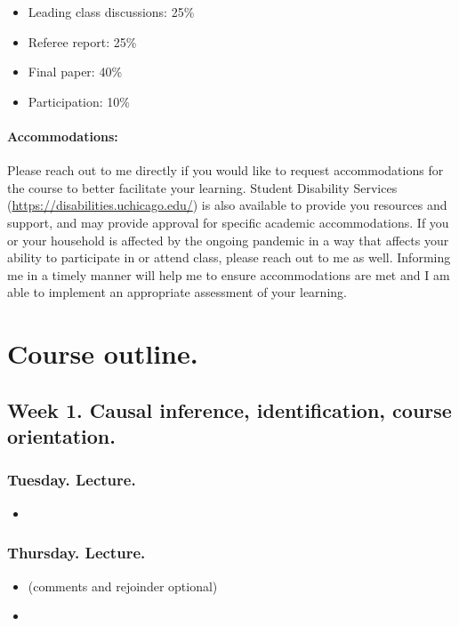 \documentclass[letterpaper, 12pt, parskip=full,DIV=10]{scrartcl}
\begin{document}
\begin{itemize}[topsep=0pt,itemsep=-1ex,partopsep=1ex,parsep=1ex]
\item Leading class discussions: 25\% 
\item Referee report: 25\%
\item Final paper: 40\%
\item Participation: 10\%
\end{itemize}

\paragraph{Accommodations:} Please reach out to me directly if you would like to request accommodations for the course to better facilitate your learning. Student Disability Services (\url{https://disabilities.uchicago.edu/}) is also available to provide you resources and support, and may provide approval for specific academic accommodations. If you or your household is affected by the ongoing pandemic in a way that affects your ability to participate in or attend class, please reach out to me as well. Informing me in a timely manner will help me to ensure accommodations are met and I am able to implement an appropriate assessment of your learning. 


\section*{Course outline.}

\subsection*{Week 1. Causal inference, identification, course orientation.}


\subsubsection*{Tuesday. Lecture.}
\begin{itemize}
\item {}
\end{itemize}

\subsubsection*{Thursday. Lecture.}

\begin{itemize}
\item {}

(comments and rejoinder optional)
\item {}
\end{itemize}
\end{document}
